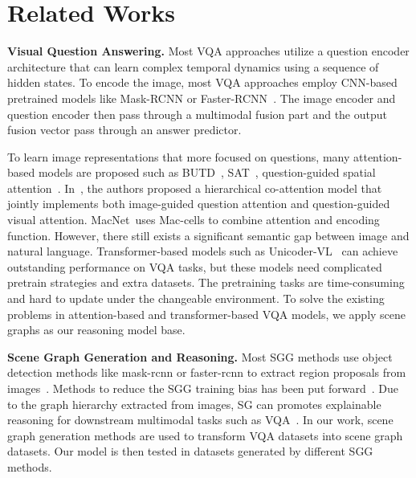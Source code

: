 \documentclass[letterpaper]{article} %
\begin{document}
\section{Related Works}
\noindent\textbf{Visual Question Answering.}
Most VQA approaches utilize a question encoder architecture that can learn complex temporal dynamics using a sequence of hidden states. To encode the image, most VQA approaches employ CNN-based pretrained models like Mask-RCNN or Faster-RCNN~\cite{DBLP:conf/cvpr/FanZ18,DBLP:conf/cvpr/PatroN18,DBLP:conf/cvpr/NamHK17}. The image encoder and question encoder then pass through a multimodal fusion part and the output fusion vector pass through an answer predictor.

To learn image representations that more focused on questions, many attention-based models are proposed such as BUTD~\cite{DBLP:conf/cvpr/00010BT0GZ18}, SAT~\cite{DBLP:conf/cvpr/YangHGDS16}, question-guided spatial attention~\cite{DBLP:conf/eccv/XuS16}. In~\citet{DBLP:conf/nips/LuYBP16}, the authors proposed a hierarchical co-attention model that jointly implements both image-guided question attention and question-guided visual attention.  MacNet~\cite{DBLP:conf/iclr/HudsonM18}uses Mac-cells to combine attention and encoding function. However, there still exists a significant semantic gap between image and natural language. Transformer-based models such as Unicoder-VL~\cite{DBLP:conf/aaai/LiDFGJ20} can achieve outstanding performance on VQA tasks, but these models need complicated pretrain strategies and extra datasets. The pretraining tasks are time-consuming and hard to update under the changeable environment. To solve the existing problems in attention-based and transformer-based VQA models, we apply scene graphs as our reasoning model base.

\vspace{0.05in}
\noindent\textbf{Scene Graph Generation and Reasoning.}
Most SGG methods use object detection methods like mask-rcnn or faster-rcnn to extract region proposals from images~\cite{DBLP:conf/cvpr/XuZCF17,DBLP:conf/eccv/YangLLBP18,DBLP:conf/cvpr/ZellersYTC18,DBLP:conf/nips/WooKCK18,DBLP:conf/cvpr/DaiZL17,DBLP:conf/iccv/LiOZWW17,DBLP:conf/eccv/YinSLYWSL18}. Methods to reduce the SGG training bias has been put forward~\cite{DBLP:conf/cvpr/TangNHSZ20}. Due to the graph hierarchy extracted from images, SG can promotes explainable reasoning for downstream multimodal tasks such as VQA~\cite{DBLP:conf/bmvc/ZhangCX19}. In our work, scene graph generation methods are used to transform VQA datasets into scene graph datasets. Our model is then tested in datasets generated by different SGG methods.
\end{document}
